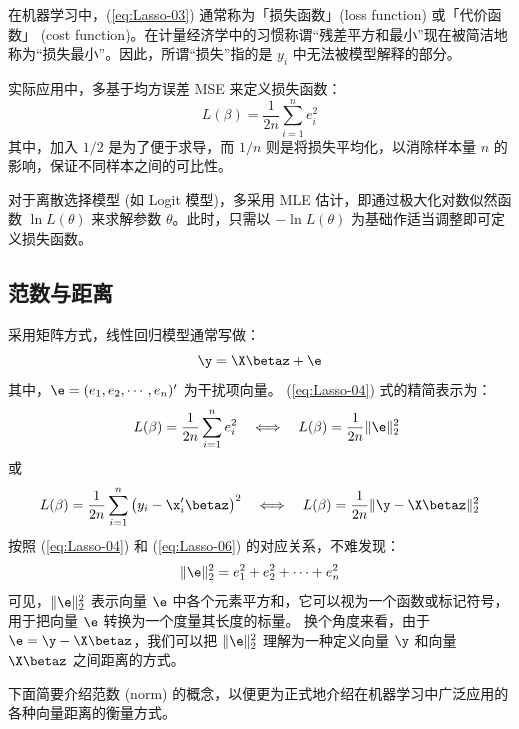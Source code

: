 在机器学习中，(\ref{eq:Lasso-03}) 通常称为「损失函数」(loss function) 或「代价函数」 (cost function)。在计量经济学中的习惯称谓“残差平方和最小”现在被简洁地称为“损失最小”。因此，所谓“损失”指的是 $y_i$ 中无法被模型解释的部分。
  
实际应用中，多基于均方误差 MSE 来定义损失函数：
\begin{equation}\label{eq:Lasso-04}
L(\beta)=\frac{1}{2 n} \sum_{i=1}^{n}e_i^{2}
\end{equation}
其中，加入 ${1}/{2}$ 是为了便于求导，而 ${1}/{n}$ 则是将损失平均化，以消除样本量 $n$ 的影响，保证不同样本之间的可比性。

对于离散选择模型 (如 Logit 模型)，多采用 MLE 估计，即通过极大化对数似然函数 $\ln L(\theta)$ 来求解参数 $\theta$。此时，只需以 $-\ln L(\theta)$ 为基础作适当调整即可定义损失函数。 


\subsection{范数与距离}\label{sec:Lasso-norm}

采用矩阵方式，线性回归模型通常写做：
$$
\y = \X \betaz + \e
$$
其中，$\e = (e_1,e_2,\cdots,e_n)'$ 为干扰项向量。
(\ref{eq:Lasso-04}) 式的精简表示为：
\begin{equation}\label{eq:Lasso-06}
\quad L(\beta)=\frac{1}{2 n} \sum_{i=1}^{n}e_i^{2}
\quad \Longleftrightarrow \quad
L(\beta)=\frac{1}{2 n} \|\e\|_2^2 
\end{equation}
或
\begin{equation}\label{eq:Lasso-06-b}
L(\beta)=\frac{1}{2 n} \sum_{i=1}^{n}\left(y_{i}-\x_{i}'\betaz\right)^{2}
\quad \Longleftrightarrow \quad
L(\beta)=\frac{1}{2 n} \|\y - \X \betaz\|_2^2
\end{equation}
按照 (\ref{eq:Lasso-04}) 和 (\ref{eq:Lasso-06}) 的对应关系，不难发现：
$$\|\e\|_2^2 = e_1^2 + e_2^2 + \cdots + e_n^2$$
可见，$\|\e\|_2^2$ 表示向量 $\e$ 中各个元素平方和，它可以视为一个函数或标记符号，用于把向量 $\e$ 转换为一个度量其长度的标量。
换个角度来看，由于 $\e = \y - \X \betaz$，我们可以把 $\|\e\|_2^2$ 理解为一种定义向量 $\y$ 和向量 $\X \betaz$ 之间距离的方式。

下面简要介绍范数 (norm) 的概念，以便更为正式地介绍在机器学习中广泛应用的各种向量距离的衡量方式。

